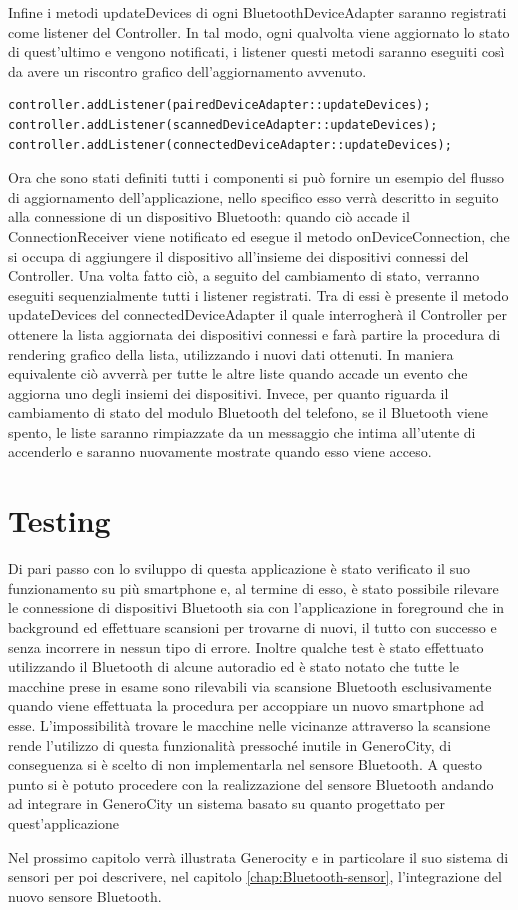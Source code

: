 Infine i metodi updateDevices di ogni BluetoothDeviceAdapter saranno registrati come listener del Controller. In tal modo, ogni qualvolta viene aggiornato lo stato di quest'ultimo e vengono notificati, i listener questi metodi saranno eseguiti così da avere un riscontro grafico dell'aggiornamento avvenuto.
\begin{verbatim}
controller.addListener(pairedDeviceAdapter::updateDevices);
controller.addListener(scannedDeviceAdapter::updateDevices);
controller.addListener(connectedDeviceAdapter::updateDevices);
\end{verbatim}

Ora che sono stati definiti tutti i componenti si può fornire un esempio del flusso di aggiornamento dell'applicazione, nello specifico esso verrà descritto in seguito alla connessione di un dispositivo Bluetooth: quando ciò accade il ConnectionReceiver viene notificato ed esegue il metodo onDeviceConnection, che si occupa di aggiungere il dispositivo all'insieme dei dispositivi connessi del Controller. Una volta fatto ciò, a seguito del cambiamento di stato, verranno eseguiti sequenzialmente tutti i listener registrati. Tra di essi è presente il metodo updateDevices del connectedDeviceAdapter il quale interrogherà il Controller per ottenere la lista aggiornata dei dispositivi connessi e farà partire la procedura di rendering grafico della lista, utilizzando i nuovi dati ottenuti. In maniera equivalente ciò avverrà per tutte le altre liste quando accade un evento che aggiorna uno degli insiemi dei dispositivi. Invece, per quanto riguarda il cambiamento di stato del modulo Bluetooth del telefono, se il Bluetooth viene spento, le liste saranno rimpiazzate da un messaggio che intima all'utente di accenderlo e saranno nuovamente mostrate quando esso viene acceso. 

\section{Testing}
Di pari passo con lo sviluppo di questa applicazione è stato verificato il suo funzionamento su più smartphone e, al termine di esso, è stato possibile rilevare le connessione di dispositivi Bluetooth sia con l'applicazione in foreground che in background ed effettuare scansioni per trovarne di nuovi, il tutto con successo e senza incorrere in nessun tipo di errore. Inoltre qualche test è stato effettuato utilizzando il Bluetooth di alcune autoradio ed è stato notato che tutte le macchine prese in esame sono rilevabili via scansione Bluetooth esclusivamente quando viene effettuata la procedura per accoppiare un nuovo smartphone ad esse. L'impossibilità trovare le macchine nelle vicinanze attraverso la scansione rende l'utilizzo di questa funzionalità pressoché inutile in GeneroCity, di conseguenza si è scelto di non implementarla nel sensore Bluetooth. A questo punto si è potuto procedere con la realizzazione del sensore Bluetooth andando ad integrare in GeneroCity un sistema basato su quanto progettato per quest'applicazione

Nel prossimo capitolo verrà illustrata Generocity e in particolare il suo sistema di sensori per poi descrivere, nel capitolo \ref{chap:Bluetooth-sensor}, l'integrazione del nuovo sensore Bluetooth.
